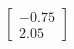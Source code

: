 \documentclass[preview]{standalone}
\begin{document}
\begin{align*}
\begin{bmatrix} -0.75 \\ 2.05 \end{bmatrix}
\end{align*}
\end{document}
